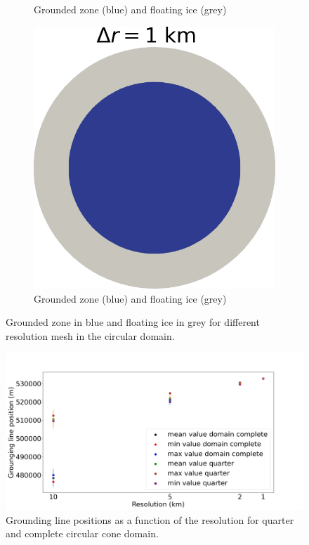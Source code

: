 \documentclass{article}
\begin{document}
\begin{figure}[!h]
\begin{subfigure}{0.25\textwidth}
		\caption{Grounded zone (blue) and floating ice (grey)}
		\label{figCONE2}
	\end{subfigure}\hfil %
	\begin{subfigure}{0.25\textwidth}
		\includegraphics[width=\linewidth]{../fig/Grounded_zone_1km_CONE.png}
		\caption{Grounded zone (blue) and floating ice (grey)}
		\label{CONE1KM}
	\end{subfigure}
	\caption{Grounded zone in blue and floating ice in grey for different resolution mesh in the circular domain.}
	\label{figCONO1}
\end{figure}

\begin{figure}[!h]
	\centering
	\includegraphics[width=0.8\linewidth]{../fig/Figure_CONE_GL_positions.png}
	\caption{Grounding line positions as a function of the resolution for quarter and complete circular cone domain.}
	\label{Grounding_lines__CONE_comparison}
\end{figure}
\end{document}
